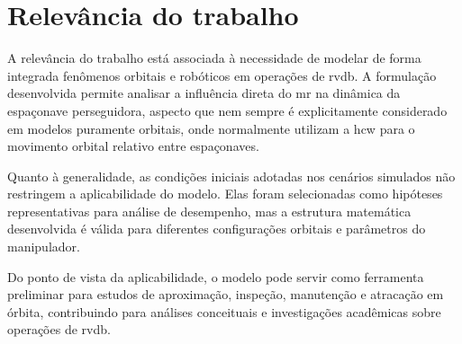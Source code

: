 \section{Relevância do trabalho}

A relevância do trabalho está associada à necessidade de modelar de forma integrada fenômenos orbitais e robóticos em operações de \gls{rvdb}.
A formulação desenvolvida permite analisar a influência direta do \gls{mr} na dinâmica da espaçonave perseguidora, aspecto que nem sempre é explicitamente considerado em modelos puramente orbitais, onde normalmente utilizam a \gls{hcw} para o movimento orbital relativo entre espaçonaves.


Quanto à generalidade, as condições iniciais adotadas nos cenários simulados não restringem a aplicabilidade do modelo.
Elas foram selecionadas como hipóteses representativas para análise de desempenho, mas a estrutura matemática desenvolvida é válida para diferentes configurações orbitais e parâmetros do manipulador.

Do ponto de vista da aplicabilidade, o modelo pode servir como ferramenta preliminar para estudos de aproximação, inspeção, manutenção e atracação em órbita, contribuindo para análises conceituais e investigações acadêmicas sobre operações de \gls{rvdb}.